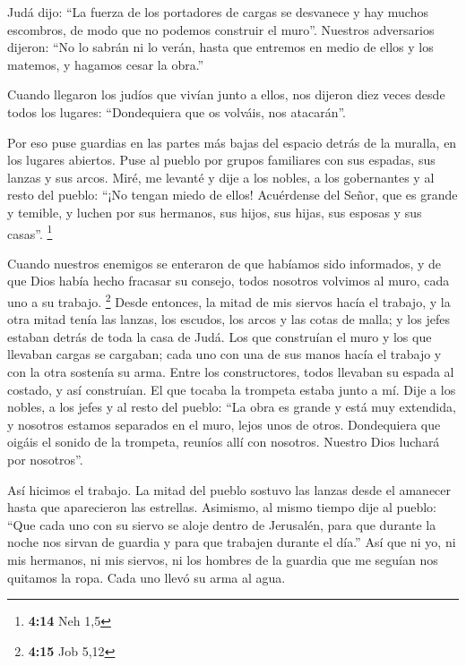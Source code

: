  Judá dijo: ``La fuerza de los portadores de cargas se
desvanece y hay muchos escombros, de modo que no podemos construir el
muro''.  Nuestros adversarios dijeron: ``No lo sabrán ni
lo verán, hasta que entremos en medio de ellos y los matemos, y hagamos
cesar la obra.''

 Cuando llegaron los judíos que vivían junto a ellos, nos
dijeron diez veces desde todos los lugares: ``Dondequiera que os
volváis, nos atacarán''.

 Por eso puse guardias en las partes más bajas del
espacio detrás de la muralla, en los lugares abiertos. Puse al pueblo
por grupos familiares con sus espadas, sus lanzas y sus arcos.
 Miré, me levanté y dije a los nobles, a los gobernantes
y al resto del pueblo: ``¡No tengan miedo de ellos! Acuérdense del
Señor, que es grande y temible, y luchen por sus hermanos, sus hijos,
sus hijas, sus esposas y sus casas''. \footnote{\textbf{4:14} Neh 1,5}

 Cuando nuestros enemigos se enteraron de que habíamos
sido informados, y de que Dios había hecho fracasar su consejo, todos
nosotros volvimos al muro, cada uno a su trabajo. \footnote{\textbf{4:15}
  Job 5,12}  Desde entonces, la mitad de mis siervos
hacía el trabajo, y la otra mitad tenía las lanzas, los escudos, los
arcos y las cotas de malla; y los jefes estaban detrás de toda la casa
de Judá.  Los que construían el muro y los que llevaban
cargas se cargaban; cada uno con una de sus manos hacía el trabajo y con
la otra sostenía su arma.  Entre los constructores, todos
llevaban su espada al costado, y así construían. El que tocaba la
trompeta estaba junto a mí.  Dije a los nobles, a los
jefes y al resto del pueblo: ``La obra es grande y está muy extendida, y
nosotros estamos separados en el muro, lejos unos de otros.
 Dondequiera que oigáis el sonido de la trompeta, reuníos
allí con nosotros. Nuestro Dios luchará por nosotros''.

 Así hicimos el trabajo. La mitad del pueblo sostuvo las
lanzas desde el amanecer hasta que aparecieron las estrellas.
 Asimismo, al mismo tiempo dije al pueblo: ``Que cada uno
con su siervo se aloje dentro de Jerusalén, para que durante la noche
nos sirvan de guardia y para que trabajen durante el día.''
 Así que ni yo, ni mis hermanos, ni mis siervos, ni los
hombres de la guardia que me seguían nos quitamos la ropa. Cada uno
llevó su arma al agua.

